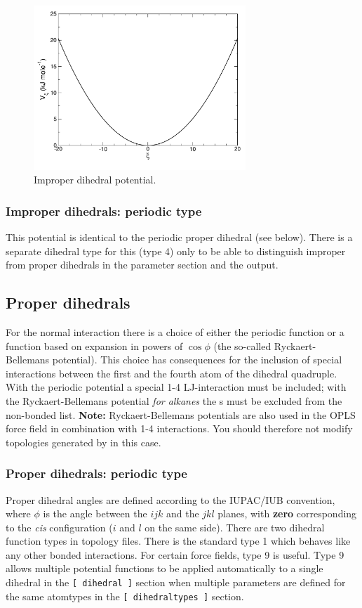 \begin{figure}
\centerline{\includegraphics[width=8cm]{plots/f-imps}}
\caption{Improper dihedral potential.}
\label{fig:imps}
\end{figure}

\subsubsection{Improper dihedrals: periodic type}
\label{subsec:periodicimproperdihedral}
This potential is identical to the periodic proper dihedral (see below).
There is a separate dihedral type for this (type 4) only to be able
to distinguish improper from proper dihedrals in the parameter section
and the output.

\subsection{Proper dihedrals}
For the normal  interaction there is a choice of
either the {\gromos} periodic function or a function based on
expansion in powers of $\cos \phi$ (the so-called Ryckaert-Bellemans
potential). This choice has consequences for the inclusion of special
interactions between the first and the fourth atom of the dihedral
quadruple. With the periodic {\gromos} potential a special 1-4
LJ-interaction must be included; with the Ryckaert-Bellemans potential
{\em for alkanes} the s must be excluded
from the non-bonded list.  {\bf Note:} Ryckaert-Bellemans potentials
are also used in {\eg} the OPLS force field in combination with 1-4
interactions. You should therefore not modify topologies generated by
{\tt {}} in this case.

\subsubsection{Proper dihedrals: periodic type}
\label{subsec:properdihedral}
Proper dihedral angles are defined according to the IUPAC/IUB
convention, where $\phi$ is the angle between the $ijk$ and the $jkl$
planes, with {\bf zero} corresponding to the {\em cis} configuration
($i$ and $l$ on the same side). There are two dihedral function types
in {\gromacs} topology files. There is the standard type 1 which behaves
like any other bonded interactions. For certain force fields, type 9
is useful. Type 9 allows multiple potential functions to be applied
automatically to a single dihedral in the {\tt [ dihedral ]} section
when multiple parameters are defined for the same atomtypes
in the {\tt [ dihedraltypes ]} section.


